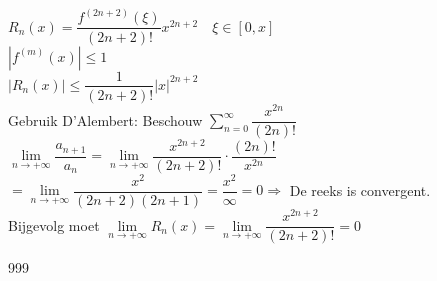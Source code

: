 \documentclass[a4paper]{article}
\begin{document}
\begin{enumerate}
$R_n(x)=\dfrac{f^{(2n+2)}(\xi)}{(2n+2)!}x^{2n+2}\quad \xi\in[0,x]$\\

$\left|f^{(m)}(x)\right|\leq 1$\\

$\left|R_n(x)\right|\leq\dfrac{1}{(2n+2)!}|x|^{2n+2}$\\

Gebruik D'Alembert: Beschouw $\displaystyle\sum_{n=0}^{\infty}\dfrac{x^{2n}}{(2n)!}$\\

$\lim\limits_{n\rightarrow +\infty}\dfrac{a_{n+1}}{a_n}=\lim\limits_{n\rightarrow +\infty}\dfrac{x^{2n+2}}{(2n+2)!}\cdot\dfrac{(2n)!}{x^{2n}}$\\

$=\lim\limits_{n\rightarrow +\infty}\dfrac{x^2}{(2n+2)(2n+1)} = \dfrac{x^2}{\infty}=0 \Rightarrow$ De reeks is convergent.\\

Bijgevolg moet $\lim\limits_{n\rightarrow +\infty}R_n(x) = \lim\limits_{n\rightarrow +\infty}\dfrac{x^{2n+2}}{(2n+2)!}=0$  \\

\end{enumerate}

\begin{thebibliography}{999}
\end{thebibliography}
\end{document}
